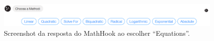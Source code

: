 \begin{figure}[h!tbp]
    \centering
    \includegraphics[width=1\linewidth]{img/bot1_3.png}
    \caption{Screenshot da resposta do MathHook ao escolher ``Equations''.}
    \label{fig:bot1_3}
\end{figure}